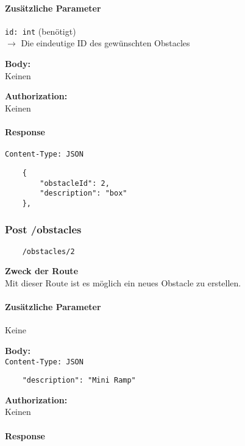 \paragraph{Zusätzliche Parameter}
\lstinline{id: int} (benötigt) \\
$\rightarrow$ Die eindeutige ID des gewünschten Obstacles


\textbf{Body:} \\
Keinen

\textbf{Authorization:} \\
Keinen

\paragraph{Response }

\lstinline{Content-Type: JSON}
\begin{lstlisting}
    {
        "obstacleId": 2,
        "description": "box"
    },
\end{lstlisting}

\pagebreak


\subsubsection{Post /obstacles}

\begin{lstlisting}
    /obstacles/2
\end{lstlisting}

\textbf{Zweck der Route} \\
Mit dieser Route ist es möglich ein neues Obstacle zu erstellen.





\paragraph{Zusätzliche Parameter}
Keine


\textbf{Body:} \\
\lstinline{Content-Type: JSON}
\begin{lstlisting}
    "description": "Mini Ramp"
\end{lstlisting}

\textbf{Authorization:} \\
Keinen

\paragraph{Response }

